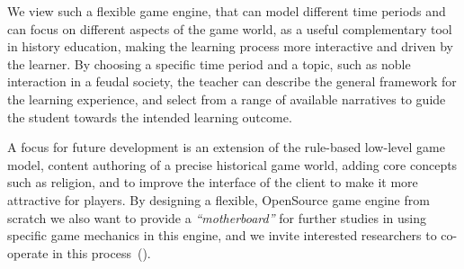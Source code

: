 \documentclass[11pt]{article}
\newcommand{\hwlcomment}[1]{$\spadesuit$\textsc{#1}$\spadesuit$}
\renewcommand{\hwlcomment}[1]{}
\begin{document}
We view such a flexible game engine, that can model different time periods and can focus on different
aspects of the game world, as a useful complementary tool in history education, making the
learning process more interactive and driven by the learner. By choosing a specific time period
and a  topic, such as noble interaction in a feudal society, the teacher
can describe the general framework for the learning experience, and select from
a range of available narratives to guide the student towards the intended learning outcome.

\hwlcomment{Comment on current size of server, size of DB, and security enhancements}

A focus for future development is an extension of the rule-based low-level game model,
content authoring of a precise historical game world, adding core concepts such as religion, and to
improve the interface of the client to make it more attractive for players.
%
By designing a flexible, OpenSource game engine from scratch we also want to provide a
\emph{``motherboard''} for further studies in using specific game mechanics in this engine,
and we invite interested researchers to co-operate in this process~(\cite{JominiEngineURL}).

\hwlcomment{Comment on macro-vs-micro history; the importance of a \emph{moderated} game, where an experience player acts as a ``herald'' advising other players about proper in-game conduct; usefulness of open source, built-from-scratch game engine, over modding of an existing engine; importance of easy content authoring.}

\end{document}
